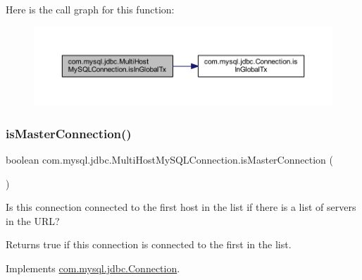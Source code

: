 Here is the call graph for this function\+:
\nopagebreak
\begin{figure}[H]
\begin{center}
\leavevmode
\includegraphics[width=350pt]{classcom_1_1mysql_1_1jdbc_1_1_multi_host_my_s_q_l_connection_a7a8d4c611693701c71532835d4f1fffa_cgraph}
\end{center}
\end{figure}
\mbox{\label{classcom_1_1mysql_1_1jdbc_1_1_multi_host_my_s_q_l_connection_a63f3a1689c557f644de8accf62405885}} 
\subsubsection{\texorpdfstring{is\+Master\+Connection()}{isMasterConnection()}}
{\footnotesize\ttfamily boolean com.\+mysql.\+jdbc.\+Multi\+Host\+My\+S\+Q\+L\+Connection.\+is\+Master\+Connection (\begin{DoxyParamCaption}{ }\end{DoxyParamCaption})}

Is this connection connected to the first host in the list if there is a list of servers in the U\+RL?

\begin{DoxyReturn}{Returns}
true if this connection is connected to the first in the list. 
\end{DoxyReturn}


Implements \mbox{\hyperlink{interfacecom_1_1mysql_1_1jdbc_1_1_connection_a39d6c162da8f21b7c2a3299f91e7c65a}{com.\+mysql.\+jdbc.\+Connection}}.

